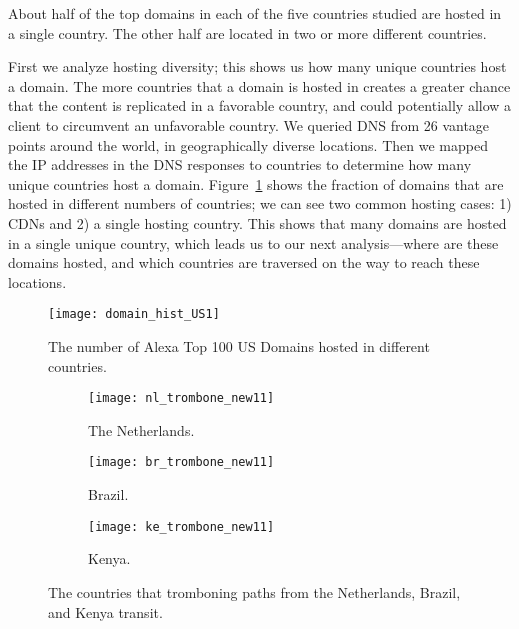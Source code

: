 \begin{finding}
About half of the top domains in each of the five countries studied are hosted in a single country.  The other half are located in two or more different countries.
\end{finding}
\noindent
First we analyze hosting diversity; this shows us how many unique
countries host a domain.  The more countries that a domain is hosted
in creates a greater chance that the content is replicated in a
favorable country, and could potentially allow a client to circumvent
an unfavorable country.  We queried DNS from 26 vantage points around
the world, in geographically diverse locations.  Then we
mapped the IP addresses in the DNS responses to countries to determine
how many unique countries host a domain.  Figure~\ref{fig:host_diversity} shows the fraction of domains that are hosted in different numbers of countries; we can see two common hosting cases: 1) CDNs and 2) a single hosting country.  This shows that many domains are hosted in a single unique country, which leads us to our next analysis---where are these domains hosted, and which countries are traversed on the way to reach these locations.


\begin{figure}[t]
\centering
\texttt{[image: domain\_hist\_US1]}
\caption{The number of Alexa Top 100 US Domains hosted in different countries.}
\label{fig:host_diversity}
\end{figure}


\begin{figure*}[t!]
\begin{minipage}{\linewidth}
\begin{subfigure}[b]{.32\linewidth}
\texttt{[image: nl\_trombone\_new11]}
\caption{The Netherlands.\label{fig:trombone_netherlands}}
\end{subfigure}
\begin{subfigure}[b]{.32\linewidth}
\texttt{[image: br\_trombone\_new11]}
\caption{Brazil.\label{fig:trombone_brazil}}
\end{subfigure}
\begin{subfigure}[b]{.32\linewidth}
\texttt{[image: ke\_trombone\_new11]}
\caption{Kenya.\label{fig:trombone_kenya}}
\end{subfigure}
\end{minipage}
\caption{The countries that tromboning paths from the Netherlands, Brazil, and Kenya transit.}
\label{fig:trombone}
\end{figure*}



